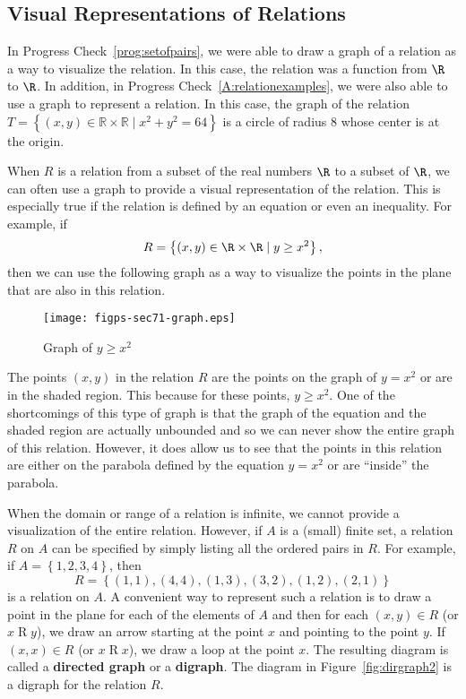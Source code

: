 \subsection*{Visual Representations of Relations}
In Progress Check~\ref{prog:setofpairs}, we were able to draw a graph of a relation as a way to visualize the relation.  In this case, the relation was a function from $\R$ to $\R$.  In addition, in Progress Check~\ref{A:relationexamples}, we were also able to use a graph to represent a relation.  In this case, the graph of the relation $T = \left\{ {\left( {x, y} \right) \in \mathbb{R} \times \mathbb{R}   \mid x^2  + y^2  = 64} \right\}$ is a circle of radius 8 whose center is at the origin.

When $R$ is a relation from a subset of the real numbers $\R$ to a subset of $\R$, we can often use a graph to provide a visual representation of the relation.  This is especially true if the relation is defined by an equation or even an inequality.  For example, if
\[
R = \left\{ (x, y) \in \R \times \R \mid y \geq x^2 \right\},
\]
then we can use the following graph as a way to visualize the points in the plane that are also in this relation.
\begin{figure}[h]
\begin{center}
\texttt{[image: figps-sec71-graph.eps]}
\caption{Graph of $y \geq x^2$} \label{fig:graph-relation}
\end{center}
\end{figure}

\newpar
The points $(x, y)$ in the relation $R$ are the points on the graph of $y = x^2$ or are in the shaded region.  This because for these points, $y \geq x^2$. One of the shortcomings of this type of graph is that the graph of the equation and the shaded region are actually unbounded and so we can never show the entire graph of this relation.  However, it does allow us to see that the points in this relation are either on the parabola defined by the equation $y = x^2$ or are ``inside'' the parabola.

When the domain or range of a relation is infinite, we cannot provide a visualization of the entire relation.  However, if  $A$  is a (small) finite set, a relation  $R$  on  $A$  can be specified by simply listing all the ordered pairs in  $R$.  For example,  if  $A = \left\{ {1, 2, 3, 4} \right\}$, then 
\[
R = \left\{ {( {1, 1} ), ( {4, 4} ), ( {1, 3} ), ( {3, 2} ), ( {1, 2} ), ( {2, 1} )} \right\}
\]
is a relation  on  $A$.  A convenient way to represent such a relation is to draw a point in the plane for each of the elements of  $A$  and then for each  $\left( {x, y} \right) \in R$ (or  
$x \mathrel{R} y$),  we draw an arrow starting at the point $x$  and pointing to the point $y$.  If  
$\left( {x, x} \right) \in R$ (or  $x \mathrel{R} x$), we draw a loop at the point  $x$.  The resulting diagram is called a \textbf{directed graph} \label{directedgraph}
%
 or a \textbf{digraph}.
%
  The diagram in Figure~\ref{fig:dirgraph2} is a digraph for the relation  $R$.

